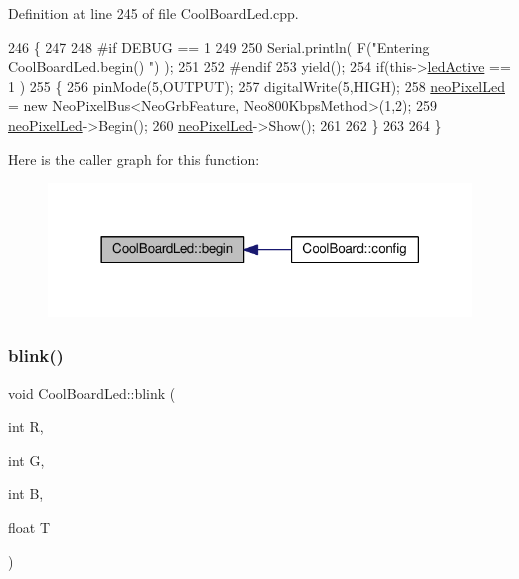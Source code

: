 Definition at line 245 of file Cool\+Board\+Led.\+cpp.


\begin{DoxyCode}
246 \{
247 
248 \textcolor{preprocessor}{#if DEBUG == 1}
249 
250     Serial.println( F(\textcolor{stringliteral}{"Entering CoolBoardLed.begin() "}) );
251 
252 \textcolor{preprocessor}{#endif}
253     yield();
254     \textcolor{keywordflow}{if}(this->\hyperlink{class_cool_board_led_aadd04d2ecf123247718d77f42fba7f08}{ledActive} == 1 )
255     \{
256         pinMode(5,OUTPUT);
257         digitalWrite(5,HIGH);
258         \hyperlink{class_cool_board_led_ac2c13fa462a010cd9242bf297c013923}{neoPixelLed} = \textcolor{keyword}{new} NeoPixelBus<NeoGrbFeature, Neo800KbpsMethod>(1,2); 
259         \hyperlink{class_cool_board_led_ac2c13fa462a010cd9242bf297c013923}{neoPixelLed}->Begin();
260         \hyperlink{class_cool_board_led_ac2c13fa462a010cd9242bf297c013923}{neoPixelLed}->Show();
261 
262     \}
263 
264 \} 
\end{DoxyCode}
Here is the caller graph for this function\+:\nopagebreak
\begin{figure}[H]
\begin{center}
\leavevmode
\includegraphics[width=318pt]{de/dc0/class_cool_board_led_ae3cbde8affcc6f011cbd698c8ef911f6_icgraph}
\end{center}
\end{figure}
\mbox{\label{class_cool_board_led_a96e1ea13003eee34c9dbcef340404426}} 
\subsubsection{\texorpdfstring{blink()}{blink()}}
{\footnotesize\ttfamily void Cool\+Board\+Led\+::blink (\begin{DoxyParamCaption}\item[{int}]{R,  }\item[{int}]{G,  }\item[{int}]{B,  }\item[{float}]{T }\end{DoxyParamCaption})}

